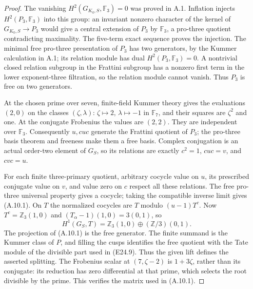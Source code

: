 \begin{proof}
The vanishing $H^2(G_{K_0,S},\mathbb F_3)=0$ was proved in A.1.
Inflation injects $H^2(P_3,\mathbb F_3)$ into this group: an invariant
nonzero character of the kernel of $G_{K_0,S}\to P_3$ would give
a central extension of $P_3$ by $\mathbb F_3$, a pro-three quotient
contradicting maximality. The five-term exact sequence proves the
injection. The minimal free pro-three presentation of $P_3$ has
two generators, by the Kummer calculation in A.1; its relation
module has dual $H^2(P_3,\mathbb F_3)=0$. A nontrivial closed
relation subgroup in the Frattini subgroup has a nonzero first
term in the lower exponent-three filtration, so the relation
module cannot vanish. Thus $P_3$ is free on two generators.

At the chosen prime over seven, finite-field Kummer theory gives
the evaluations $(2,0)$ on the classes $(\zeta,\lambda)$:
$\zeta\mapsto2$, $\lambda\mapsto-1$ in $\mathbb F_7$, and their
squares are $\zeta^2$ and one. At the conjugate Frobenius the
values are $(2,2)$. They are independent over $\mathbb F_3$.
Consequently $u,cuc$ generate the Frattini quotient of $P_3$;
the pro-three basis theorem and freeness make them a free basis.
Complex conjugation is an actual order-two element of $G_S$, so
its relations are exactly $c^2=1$, $cuc=v$, and $cvc=u$.

For each finite three-primary quotient, arbitrary cocycle value
on $u$, its prescribed conjugate value on $v$, and value zero on
$c$ respect all these relations. The free pro-three universal
property gives a cocycle; taking the compatible inverse limit
gives (A.10.1). On $T$ the normalized cocycles are $T$ modulo
$(u-1)T^c$. Now $T^c=\mathbb Z_3(1,0)$ and
$(T_\alpha-1)(1,0)=3(0,1)$, so
\[
 H^1(G_S,T)=\mathbb Z_3(1,0)\oplus(\mathbb Z/3)(0,1).
\]
The projection of (A.10.1) is the free generator. The finite summand
is the Kummer class of $P$, and filling the cusps identifies the
free quotient with the Tate module of the divisible part used in
(E24.9). Thus the given lift defines the asserted splitting.
The Frobenius scalar at $(7,\zeta-2)$ is $1+3\zeta$, rather than
its conjugate: its reduction has zero differential at that prime,
which selects the root divisible by the prime. This verifies the
matrix used in (A.10.1).
\end{proof}


